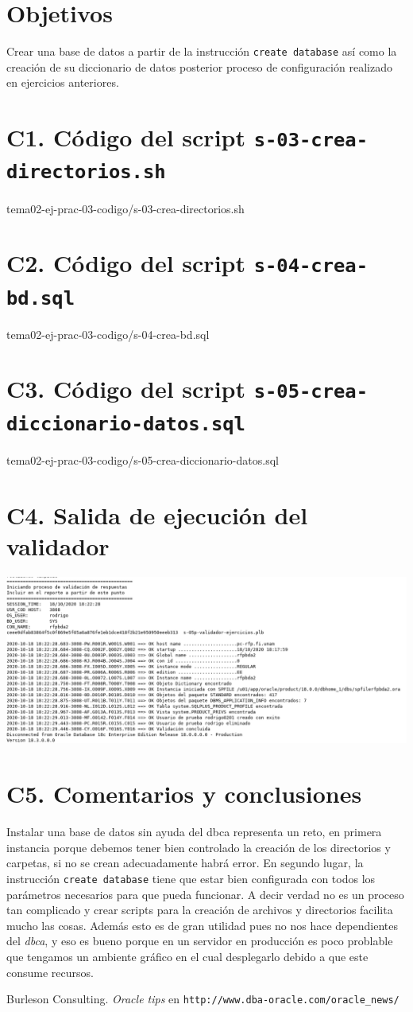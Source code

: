 \documentclass{article}
\begin{document}
\section*{Objetivos}
Crear una base de datos a partir de la instrucción \texttt{create database} así
como la creación de su diccionario de datos posterior proceso de configuración
realizado en ejercicios anteriores.

\section*{C1. Código del script \texttt{s-03-crea-directorios.sh}}

{tema02-ej-prac-03-codigo/s-03-crea-directorios.sh}

\section*{C2. Código del script \texttt{s-04-crea-bd.sql}}

{tema02-ej-prac-03-codigo/s-04-crea-bd.sql}

\section*{C3. Código del script \texttt{s-05-crea-diccionario-datos.sql}}

{tema02-ej-prac-03-codigo/s-05-crea-diccionario-datos.sql}

\section*{C4. Salida de ejecución del validador}
\includegraphics[width=\linewidth]{tema02-ej-prac-03-validador.png}

\section*{C5. Comentarios y conclusiones}

Instalar una base de datos sin ayuda del dbca representa un reto, en primera
instancia porque debemos tener bien controlado la creación de los directorios 
y carpetas, si no se crean adecuadamente habrá error. En segundo lugar, la
instrucción \texttt{create database} tiene que estar bien configurada con todos
los parámetros necesarios para que pueda funcionar. A decir verdad no es un 
proceso tan complicado y crear scripts para la creación de archivos y 
directorios facilita mucho las cosas. Además esto es de gran utilidad
pues no nos hace dependientes del \textit{dbca}, y eso es bueno
porque en un servidor en producción es poco problable que tengamos un ambiente
gráfico en el cual desplegarlo debido a que este consume recursos.

\renewcommand\refname{Bibliografía y referencias}
\begin{thebibliography}{99}
     Burleson Consulting. \textit{Oracle tips } en 
    \texttt{http://www.dba-oracle.com/oracle\_news/}
\end{thebibliography}
\end{document}
